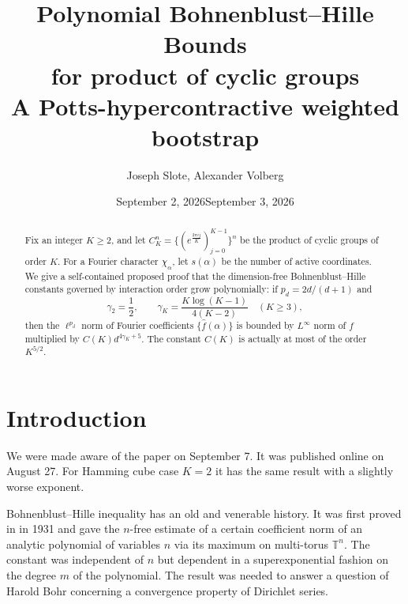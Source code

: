 \documentclass[11pt]{article}
\title{\textbf{Polynomial Bohnenblust--Hille Bounds\\ for product of cyclic groups}
\\[0.35em]
\large A Potts-hypercontractive weighted bootstrap}
\date{September 2, 2026}
\author{Joseph Slote, Alexander Volberg}
\date{September 3, 2026}
\theoremstyle{definition}
\theoremstyle{remark}
\newcommand{\wh}{\widehat}
\newcommand{\norm}[1]{\left\lVert #1\right\rVert}
\newcommand{\abs}[1]{\left\lvert #1\right\rvert}
\begin{document}
\maketitle


\begin{abstract}
Fix an integer $K\ge2$, and let $C_K^n =\{(e^{\frac{2\pi ij}{K}})_{j=0}^{K-1}\}^n$ be the product of
cyclic groups of order $K$.  For a Fourier character $\chi_\alpha$, let
$s(\alpha)$ be the number of active coordinates.  We give a self-contained
proposed proof that the dimension-free Bohnenblust--Hille constants governed
by interaction order grow polynomially: if
$p_d=2d/(d+1)$ and
\[
 \gamma_2=\frac12,
 \qquad
 \gamma_K=\frac{K\log(K-1)}{4(K-2)}\quad(K\ge3),
\]
then the $\ell^{p_d}$ norm of Fourier coefficients $\{\hat f(\alpha)\}$ is bounded  by $L^\infty$ norm of $f$ multiplied by $C(K) d^{4\gamma_K+5}$.
The constant $C(K)$ is actually at most of the order $K^{5/2}$.
\end{abstract}

\tableofcontents



\section{Introduction}

We were made aware of the paper \cite{I} on September 7. It was published online on August 27. For Hamming cube case $K=2$ it has the same result with a slightly worse exponent.

\medskip

Bohnenblust--Hille inequality has an old and venerable history. It was first proved in \cite{BohnenblustHille} in 1931 and gave the 
$n$-free estimate of a certain coefficient norm of an analytic  polynomial  of variables $n$ via its maximum on multi-torus $\mathbb T^n$.
The constant was independent of $n$ but dependent in a superexponential fashion on the degree $m$ of the polynomial.
The result was needed to answer a question of Harold Bohr concerning a convergence property of Dirichlet series.
\end{document}
